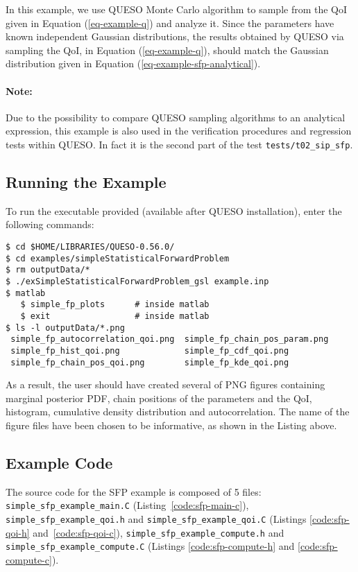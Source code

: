 In this example, we use QUESO Monte Carlo algorithm to sample from the QoI given in Equation (\ref{eq-example-q}) and analyze it.
Since the parameters have known independent Gaussian distributions, the results obtained by QUESO via sampling the QoI, in Equation (\ref{eq-example-q}), should match the Gaussian distribution given in Equation (\ref{eq-example-sfp-analytical}).


\paragraph*{Note:} Due to the possibility to compare QUESO sampling algorithms to an analytical expression, this example is also used in the verification procedures and regression tests within QUESO. In fact it is the second part of the test \verb+tests/t02_sip_sfp+.


\subsection{Running the Example}\label{sec:sfp-run}

To run the executable provided (available after QUESO installation), enter the following commands:
\begin{lstlisting}[label={},caption={}]
$ cd $HOME/LIBRARIES/QUESO-0.56.0/
$ cd examples/simpleStatisticalForwardProblem
$ rm outputData/*
$ ./exSimpleStatisticalForwardProblem_gsl example.inp
$ matlab
   $ simple_fp_plots      # inside matlab
   $ exit                 # inside matlab
$ ls -l outputData/*.png
 simple_fp_autocorrelation_qoi.png  simple_fp_chain_pos_param.png
 simple_fp_hist_qoi.png             simple_fp_cdf_qoi.png
 simple_fp_chain_pos_qoi.png        simple_fp_kde_qoi.png
\end{lstlisting}

As a result, the user should have created several of PNG figures containing marginal posterior PDF, chain positions of the parameters and the QoI, histogram, cumulative density distribution and autocorrelation. The name of the figure files have been chosen to be informative, as shown in the Listing above.



\subsection{Example Code}\label{sec:code-sfp}

The source code for the SFP example is composed of 5 files:
\texttt{simple\_sfp\_example\_main.C} (Listing~\ref{code:sfp-main-c}),
\texttt{simple\_sfp\_example\_qoi.h} and \texttt{simple\_sfp\_example\_qoi.C} (Listings \ref{code:sfp-qoi-h} and~\ref{code:sfp-qoi-c}),
\texttt{simple\_sfp\_example\_compute.h}  and \texttt{simple\_sfp\_example\_compute.C} (Listings \ref{code:sfp-compute-h} and \ref{code:sfp-compute-c}).


